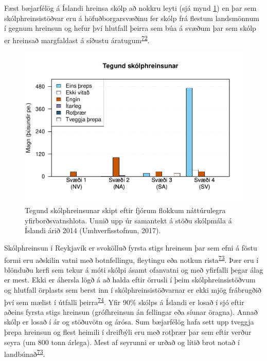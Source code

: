\documentclass[icelandic,]{book}
\begin{document}
%

Fæst bæjarfélög á Íslandi hreinsa skólp að nokkru leyti (sjá mynd \ref{fig:skolp}) en þar sem skólphreinsistöðvar eru á höfuðborgarsvæðinu fer skólp frá flestum landsmönnum í gegnum hreinsun og hefur því hlutfall þeirra sem búa á svæðum þar sem skólp er hreinsað margfaldast á síðustu áratugum\textsuperscript{\protect\hyperlink{ref-uxdeoruxf0arson2012}{72}}.

\begin{figure}[H]

{\centering \includegraphics[width=1\linewidth]{_bookdown_files/OrplastHaf_files/figure-latex/skolp-1} 

}

\caption{Tegund skólphreinsunar skipt eftir fjórum flokkum náttúrulegra yfirborðsvatnshlota. Unnið upp úr samantekt á stöðu skólpmála á Íslandi árið 2014 (Umhverfisstofnun, 2017).}\label{fig:skolp}
\end{figure}

Skólphreinsun í Reykjavík er svokölluð fyrsta stigs hreinsun þar sem efni á föstu formi eru aðskilin vatni með botnfellingu, fleytingu eða notkun rista\textsuperscript{\protect\hyperlink{ref-Umhverfisstofnun2017}{73}}. Þær eru í blönduðu kerfi sem tekur á móti skólpi ásamt ofanvatni og með yfirfalli þegar álag er mest. Ekki er áhersla lögð á að halda eftir örrusli í þeim skólphreinsistöðvum og hlutfall örplasts sem berst inn í skólphreinsistöðvarnar er ekki mjög frábrugðið því sem mælist í útfalli þeirra\textsuperscript{\protect\hyperlink{ref-magnusson2016microlitter}{74}}. Yfir 90\% skólps á Íslandi er losað í sjó eftir aðeins fyrsta stigs hreinsun (grófhreinsun án fellingar eða síunar öragna). Annað skólp er losað í ár og stöðuvötn og árósa. Sum bæjarfélög hafa sett upp tveggja þrepa hreinsun og flest heimili í dreifbýli eru með rotþrær þar sem eftir verður seyra (um 800 tonn árlega). Mest af seyrunni er urðað og lítið brot notað í landbúnað\textsuperscript{\protect\hyperlink{ref-Umhverfisstofnun2017}{73}}.
\end{document}
